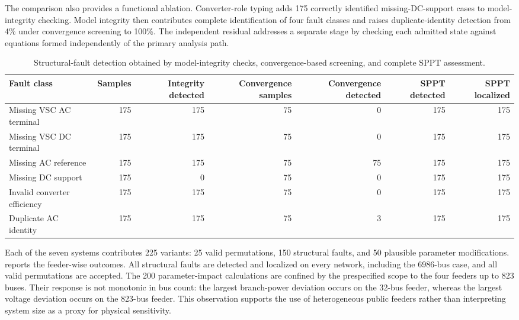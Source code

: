 The comparison also provides a functional ablation. Converter-role typing adds
175 correctly identified missing-DC-support cases to model-integrity checking.
Model integrity then contributes complete identification of four fault classes
and raises duplicate-identity detection from 4\% under convergence screening to
100\%. The independent residual addresses a separate stage by checking each
admitted state against equations formed independently of the primary analysis
path.

\begin{table}[t]
\centering
\caption{Structural-fault detection obtained by model-integrity checks,
convergence-based screening, and complete SPPT assessment.}
\label{tab:detection-results}
\footnotesize
\begin{tabularx}{\textwidth}{@{}Xrrrrrr@{}}
\toprule
Fault class & Samples & Integrity detected & Convergence samples & Convergence detected & SPPT detected & SPPT localized\\
\midrule
Missing VSC AC terminal & 175 & 175 & 75 & 0 & 175 & 175\\
Missing VSC DC terminal & 175 & 175 & 75 & 0 & 175 & 175\\
Missing AC reference & 175 & 175 & 75 & 75 & 175 & 175\\
Missing DC support & 175 & 0 & 75 & 0 & 175 & 175\\
Invalid converter efficiency & 175 & 175 & 75 & 0 & 175 & 175\\
Duplicate AC identity & 175 & 175 & 75 & 3 & 175 & 175\\
\bottomrule
\end{tabularx}
\end{table}

Each of the seven systems contributes 225 variants: 25 valid permutations, 150 structural
faults, and 50 plausible parameter modifications. 
reports the feeder-wise outcomes. All structural faults are detected and
localized on every network, including the 6986-bus case, and all valid
permutations are accepted. The 200 parameter-impact calculations are confined
by the prespecified scope to the four feeders up to 823 buses. Their response
is not monotonic in bus count: the largest branch-power deviation occurs on
the 32-bus feeder, whereas the largest voltage deviation occurs on the
823-bus feeder. This observation supports the use of heterogeneous public
feeders rather than interpreting system size as a proxy for physical
sensitivity.

